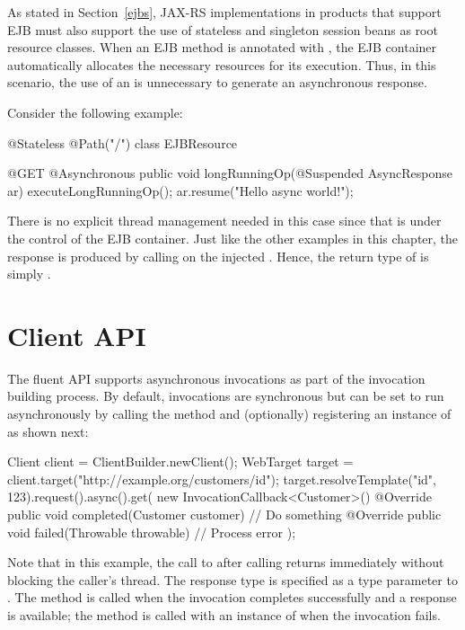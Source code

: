 As stated in Section~\ref{ejbs}, JAX-RS implementations in products that
support EJB must also support the use of stateless and singleton session beans
as root resource classes. When an EJB method is annotated with , the 
EJB container automatically allocates the necessary resources for its execution. 
Thus, in this scenario, the use of an  is unnecessary to generate
an asynchronous response.

Consider the following example:

\begin{listing}{1}
@Stateless 
@Path("/")
class EJBResource {

    @GET @Asynchronous
    public void longRunningOp(@Suspended AsyncResponse ar) {
        executeLongRunningOp();
        ar.resume("Hello async world!");
    }
}
\end{listing}

There is no explicit thread management needed in this case since that is
under the control of the EJB container. Just like the other examples in this chapter,
the response is produced by calling  on the injected . Hence, the return type of  is simply .

\section{Client API}
\label{client_api_async}

The fluent API supports asynchronous invocations as part of the invocation building process. By default, invocations are synchronous but can be set to run asynchronously by calling the  method and (optionally) registering an instance of  as shown next:

\begin{listing}{1}
Client client = ClientBuilder.newClient();
WebTarget target = client.target("http://example.org/customers/{id}");
target.resolveTemplate("id", 123).request().async().get(
    new InvocationCallback<Customer>() {
        @Override
        public void completed(Customer customer) {
            // Do something
        }
        @Override
        public void failed(Throwable throwable) {
            // Process error
        }
    });
\end{listing}

Note that in this example, the call to  after calling  returns immediately without blocking the caller's thread.
The response type is specified as a type parameter to . The method  is called when the invocation completes successfully and a response is available; the method  is called with an instance of  when the invocation fails.

